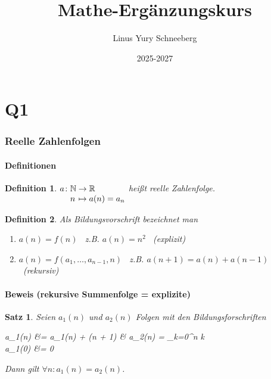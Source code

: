 \documentclass{article}
\title{Mathe-Ergänzungskurs}
\author{Linus Yury Schneeberg}
\date{2025-2027}
\newcommand\func[5]{%
	\begingroup
	\setlength\arraycolsep{0pt}
	#1\colon\begin{array}[t]{l >{{}}c<{{}} l}
		#2 & \to & #3 \\ #4 & \mapsto & #5 
	\end{array}%
	\endgroup}
\newtheorem{thm}{Satz}[section]
\newtheorem{defn}{Definition}[section]
\newenvironment{aleq*}{\begin{equation*}\begin{aligned}}{\end{aligned}\end{equation*}}
\begin{document}
	\maketitle
	\tableofcontents
	\newpage
	
	\part{Q1}
	\section{Reelle Zahlenfolgen}
	\subsection{Definitionen}
	\begin{defn}
	$\func{a}{\mathbb{N}}{\mathbb{R}}{n}{a(n)=a_n}$ heißt reelle Zahlenfolge.
	\end{defn}
	\begin{defn}
	Als Bildungsvorschrift bezeichnet man 
	\begin{enumerate}[label=(\alph*)]
		\item \(a(n) = f(n)\) \ z.B. \(a(n) = n^2\) \ (explizit)
		\item \(a(n) = f(a_1, \dots, a_{n-1}, n)\) \ z.B. \(a(n+1) = a(n) + a(n-1)\) \ (rekursiv)
	\end{enumerate}
\end{defn}
	
	\subsection{Beweis (rekursive Summenfolge = explizite)}
	\begin{thm}
	Seien \(a_1(n)\) und \(a_2(n)\) Folgen mit den Bildungsforschriften
	\begin{aleq*}
			a_1(n) &= a_1(n) + (n + 1) & a_2(n) = \sum_{k=0}^{n} k \\
			a_1(0) &= 0 
	\end{aleq*}
	\par
	Dann gilt \(\forall n \colon a_1(n) = a_2(n)\).
	\end{thm}
	
\end{document}
